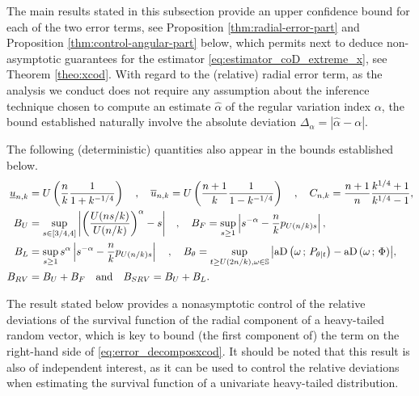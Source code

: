 \documentclass{article}
\numberwithin{equation}{section}
\newcommand{\sphere}{\mathbb{S}}
\newcommand{\aD}[2]{{\mathrm{aD}}\left({#1}\,;\,{#2}\right)}
\begin{document}
The main results stated in this subsection provide an upper
confidence bound for each of the two error terms, see Proposition
\ref{thm:radial-error-part} and Proposition
\ref{thm:control-angular-part} below, which permits next to deduce
non-asymptotic guarantees for the estimator
\eqref{eq:estimator_coD_extreme_x}, see Theorem \ref{theo:xcod}. With
regard to the (relative) radial error term, as the analysis we
conduct does not require any assumption about the inference technique
chosen to compute an estimate $\widehat{\alpha}$ of the regular
variation index $\alpha$, the bound established naturally involve the
absolute deviation \(\Delta_{\alpha}=|\widehat{\alpha}-\alpha|\).

The following (deterministic) quantities also appear in the bounds
established below.
\begin{align}
\underline{u}_{n,k} &=
U\left(\frac{n}{k}\frac{1}{1+k^{-1/4}}\right)\quad,\quad
\overline{u}_{n,k}=U\left(\frac{n+1}{k}\frac{1}{1-k^{-1/4}}\right)\quad,\quad
C_{n,k}=\frac{n+1}{n}\frac{k^{1/4}+1}{k^{1/4}-1},\label{eq:u_quantiles}\\
B_{U} &=
\sup_{s\in[3/4,4]}{\left|\left(\frac{U(ns/k)}{U(n/k)}\right)^{\alpha}-s\right|}
\quad,\quad
B_{F} = \sup_{s\geq 1}\left|
s^{-\alpha}-\frac{n}{k}p_{U(n/k)s}
\right|,\label{eq:u_and_f_biases}\\
B_L&=\sup_{s\geq 1}s^{\alpha}\left|
s^{-\alpha}-\frac{n}{k}p_{U(n/k)s} \right|\quad,\quad
B_{\theta} = \sup_{{t\geq
U(2n/k),\omega\in\sphere} }{\left|\aD{\omega}{P_{\theta|t}} -
\aD{\omega}{\Phi}\right|},\label{eq:L_and_angle_biases}\\
B_{RV}&=B_{U}+B_{F}\quad\textnormal{and}\quad B_{SRV} =
B_U+B_L.\label{eq:rv_and_strong_rv_biases}
\end{align}

The result stated below provides a nonasymptotic control of the
relative deviations of the survival function of the radial component
of a heavy-tailed random vector, which is key to bound (the first
component of) the term on the right-hand side of
\eqref{eq:error_decomposxcod}. It should be noted that this
result is also of independent interest, as it can be used to control the
relative deviations when estimating the survival function of a univariate
heavy-tailed distribution.
\end{document}
